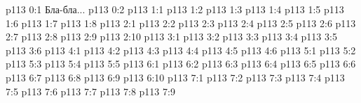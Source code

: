 \author{Глава Серафимов}
\vs p113 0:1  Бла-бла...
\vs p113 0:2 
\vs p113 1:1 
\vs p113 1:2 
\vs p113 1:3 
\vs p113 1:4 
\vs p113 1:5 
\vs p113 1:6 \pc 
\vs p113 1:7 
\vs p113 1:8 
\vs p113 2:1 
\vs p113 2:2 
\vs p113 2:3 
\vs p113 2:4 \pc 
\vs p113 2:5 
\vs p113 2:6 \pc 
\vs p113 2:7 \pc 
\vs p113 2:8 
\vs p113 2:9 
\vs p113 2:10 
\vs p113 3:1 
\vs p113 3:2 
\vs p113 3:3 
\vs p113 3:4 
\vs p113 3:5 
\vs p113 3:6 
\vs p113 4:1 
\vs p113 4:2 
\vs p113 4:3 
\vs p113 4:4 
\vs p113 4:5 
\vs p113 4:6 
\vs p113 5:1 
\vs p113 5:2 
\vs p113 5:3 
\vs p113 5:4 
\vs p113 5:5 \pc 
{}
\vs p113 6:1 
\vs p113 6:2 
\vs p113 6:3 \pc 
\vs p113 6:4 \pc 
\vs p113 6:5 
\vs p113 6:6 
\vs p113 6:7 
\vs p113 6:8 \pc 
\vs p113 6:9 \pc 
\vs p113 6:10 
\vs p113 7:1 
\vs p113 7:2 
\vs p113 7:3 
\vs p113 7:4 
\vs p113 7:5 
\vs p113 7:6 
\vs p113 7:7 \pc 
\vs p113 7:8 
\vsetoff
\vs p113 7:9 
\quizlink
